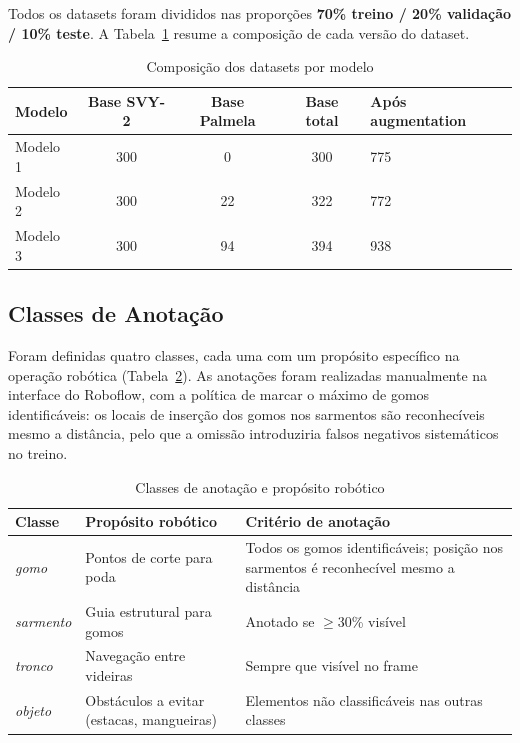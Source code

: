 \documentclass[12pt, a4paper]{article}
\begin{document}
Todos os datasets foram divididos nas proporções \textbf{70\% treino /
20\% validação / 10\% teste}. A Tabela~\ref{tab:datasets} resume a
composição de cada versão do dataset.

\begin{table}[H]
  \centering
  \caption{Composição dos datasets por modelo}
  \label{tab:datasets}
  \begin{tabularx}{\columnwidth}{l c c c X}
    \toprule
    \textbf{Modelo} & \textbf{Base SVY-2} & \textbf{Base Palmela}
                    & \textbf{Base total} & \textbf{Após augmentation} \\
    \midrule
    Modelo 1 & 300 & 0   & 300  & 775 \\
    Modelo 2 & 300 & 22  & 322  & 772 \\
    Modelo 3 & 300 & 94  & 394  & 938 \\
    \bottomrule
  \end{tabularx}
\end{table}

\subsection{Classes de Anotação}

Foram definidas quatro classes, cada uma com um propósito específico na
operação robótica (Tabela~\ref{tab:classes}). As anotações foram realizadas
manualmente na interface do Roboflow, com a política de marcar o máximo de
gomos identificáveis: os locais de inserção dos gomos nos sarmentos são
reconhecíveis mesmo a distância, pelo que a omissão introduziria falsos
negativos sistemáticos no treino.

\begin{table}[H]
  \centering
  \caption{Classes de anotação e propósito robótico}
  \label{tab:classes}
  \begin{tabularx}{\columnwidth}{l l X}
    \toprule
    \textbf{Classe}   & \textbf{Propósito robótico}  & \textbf{Critério de anotação} \\
    \midrule
    \textit{gomo}     & Pontos de corte para poda    & Todos os gomos identificáveis; posição nos sarmentos é reconhecível mesmo a distância \\[0.3em]
    \textit{sarmento} & Guia estrutural para gomos   & Anotado se $\geq$30\% visível \\[0.3em]
    \textit{tronco}   & Navegação entre videiras     & Sempre que visível no frame \\[0.3em]
    \textit{objeto}   & Obstáculos a evitar (estacas, mangueiras) & Elementos não classificáveis nas outras classes \\
    \bottomrule
  \end{tabularx}
\end{table}
\end{document}
